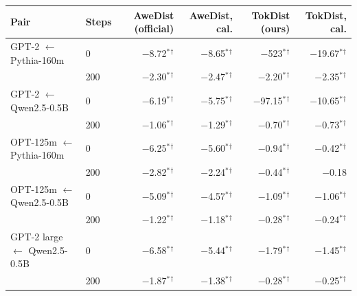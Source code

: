 \begin{tabular}{llrrrr}
\toprule
Pair & Steps & AweDist (official) & AweDist, cal. & TokDist (ours) & TokDist, cal. \\
\midrule
GPT-2 $\leftarrow$ Pythia-160m & 0 & $-$8.72$^{*}$$^{\dagger}$ & $-$8.65$^{*}$$^{\dagger}$ & $-$523$^{*}$$^{\dagger}$ & $-$19.67$^{*}$$^{\dagger}$ \\
 & 200 & $-$2.30$^{*}$$^{\dagger}$ & $-$2.47$^{*}$$^{\dagger}$ & $-$2.20$^{*}$$^{\dagger}$ & $-$2.35$^{*}$$^{\dagger}$ \\
\addlinespace
GPT-2 $\leftarrow$ Qwen2.5-0.5B & 0 & $-$6.19$^{*}$$^{\dagger}$ & $-$5.75$^{*}$$^{\dagger}$ & $-$97.15$^{*}$$^{\dagger}$ & $-$10.65$^{*}$$^{\dagger}$ \\
 & 200 & $-$1.06$^{*}$$^{\dagger}$ & $-$1.29$^{*}$$^{\dagger}$ & $-$0.70$^{*}$$^{\dagger}$ & $-$0.73$^{*}$$^{\dagger}$ \\
\addlinespace
OPT-125m $\leftarrow$ Pythia-160m & 0 & $-$6.25$^{*}$$^{\dagger}$ & $-$5.60$^{*}$$^{\dagger}$ & $-$0.94$^{*}$$^{\dagger}$ & $-$0.42$^{*}$$^{\dagger}$ \\
 & 200 & $-$2.82$^{*}$$^{\dagger}$ & $-$2.24$^{*}$$^{\dagger}$ & $-$0.44$^{*}$$^{\dagger}$ & $-$0.18 \\
\addlinespace
OPT-125m $\leftarrow$ Qwen2.5-0.5B & 0 & $-$5.09$^{*}$$^{\dagger}$ & $-$4.57$^{*}$$^{\dagger}$ & $-$1.09$^{*}$$^{\dagger}$ & $-$1.06$^{*}$$^{\dagger}$ \\
 & 200 & $-$1.22$^{*}$$^{\dagger}$ & $-$1.18$^{*}$$^{\dagger}$ & $-$0.28$^{*}$$^{\dagger}$ & $-$0.24$^{*}$$^{\dagger}$ \\
\addlinespace
GPT-2 large $\leftarrow$ Qwen2.5-0.5B & 0 & $-$6.58$^{*}$$^{\dagger}$ & $-$5.44$^{*}$$^{\dagger}$ & $-$1.79$^{*}$$^{\dagger}$ & $-$1.45$^{*}$$^{\dagger}$ \\
 & 200 & $-$1.87$^{*}$$^{\dagger}$ & $-$1.38$^{*}$$^{\dagger}$ & $-$0.28$^{*}$$^{\dagger}$ & $-$0.25$^{*}$$^{\dagger}$ \\
\bottomrule
\end{tabular}
